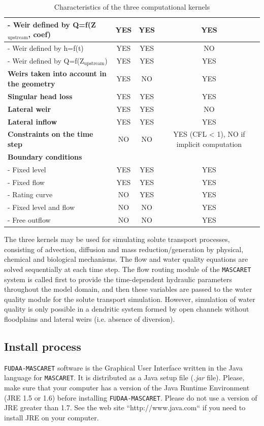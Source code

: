\documentclass[a4paper,12pt]{article}
\begin{document}
\begin{landscape}
\begin{table}
\begin{center}
{\begin{tabular}{|l|c|c|c|}
\hline 
- Weir defined by Q=f(Z$_{\mbox{upstream}}$, coef) & YES & YES & YES\tabularnewline
\hline 
- Weir defined by h=f(t) & YES & YES & NO\tabularnewline
\hline 
- Weir defined by Q=f(Z$_{\mbox{upstream}}$) & YES & YES & YES\tabularnewline
\hline 
\textbf{Weirs taken into account in the geometry} & YES & NO & YES\tabularnewline
\hline 
\textbf{Singular head loss} & YES & YES & YES\tabularnewline
\hline 
\textbf{Lateral weir} & YES & YES & NO\tabularnewline
\hline 
\textbf{Lateral inflow} & YES & YES & YES\tabularnewline
\hline 
\textbf{Constraints on the time step} & NO & NO & YES (CFL < 1), NO if implicit computation\tabularnewline
\hline 
\textbf{Boundary conditions} &  &  & \tabularnewline
\hline 
- Fixed level & YES & YES & YES\tabularnewline
\hline 
- Fixed flow & YES & YES & YES\tabularnewline
\hline 
- Rating curve & NO & YES & YES\tabularnewline
\hline 
- Fixed level and flow & NO & NO & YES\tabularnewline
\hline 
- Free outflow & NO & NO & YES\tabularnewline
\hline 

\end{tabular}

}
\end{center}

\caption{Characteristics of the three computational kernels}

\end{table}

\end{landscape}

\newpage

The three kernels may be used for simulating solute transport processes, consisting of advection, diffusion and mass reduction/generation by physical, chemical and biological mechanisms. The flow and water quality equations are solved sequentially at each time step. The flow routing module of the \texttt{MASCARET} system is called first to provide the time-dependent hydraulic parameters throughout the model domain, and then these variables are passed to the water quality module for the solute transport simulation. However, simulation of water quality is only possible in a dendritic system formed by open channels without floodplains and lateral weirs (i.e. absence of diversion).

\subsection{Install process}

\texttt{FUDAA-MASCARET} software is the Graphical User Interface written in the Java language for \texttt{MASCARET}. It is distributed as a Java setup file (\textit{.jar} file). Please, make sure that your computer has a version
of the Java Runtime Environment (JRE 1.5 or 1.6) before installing \texttt{FUDAA-MASCARET}. Please do not use a version of JRE greater than 1.7. See the web site ``http://www.java.com`` if you need to install JRE on your computer.
\end{document}
